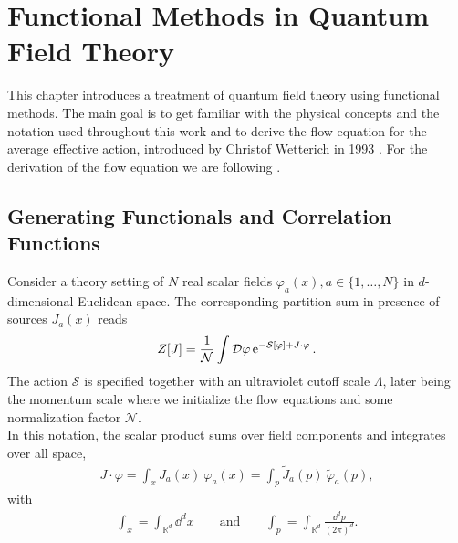 \chapter{Functional Methods in Quantum Field Theory}\label{chap:QFT}
This chapter introduces a treatment of quantum field theory using functional methods. The main goal is to get familiar with the physical concepts and the notation used throughout this work and to derive the flow equation for the average effective action, introduced by Christof Wetterich in 1993 \cite{Wetterich1992}. 
For the derivation of the flow equation we are following \cite{Gies2006, PawlowskiNPgaugeLecture}.

\section{Generating Functionals and Correlation Functions}
Consider a theory setting of $N$ real scalar fields $\varphi_a(x), a \in \{1,\dots,N\}$ in $d$-dimensional Euclidean space. The corresponding partition sum in presence of sources $J_a(x)$ reads
\begin{align}
	Z[J] = \frac{1}{\mathcal{N}} \int \mathcal{D}\varphi \operatorname{e}^{-\mathcal{S}[\varphi] + J\cdot\varphi}.
	\label{eqn:partition}
\end{align}
The action $\mathcal{S}$ is specified together with an ultraviolet cutoff scale $\Lambda$, later being the momentum scale where we initialize the flow equations and some normalization factor $\mathcal{N}$.\\
In this notation, the scalar product sums over field components and integrates over all space,
\begin{align}
	J\cdot\varphi = \int_x J_a(x) \ \varphi_a(x) = \int_p \tilde{J}_a(p) \ \tilde{\varphi}_a(p),
\end{align}
with
\begin{align}
\int_x = \int_{\mathbb{R}^d} \dd^d x \qquad \text{and} \qquad \int_p = \int_{\mathbb{R}^d} \frac{\dd^d p}{(2\pi)^d}.	
\end{align}

